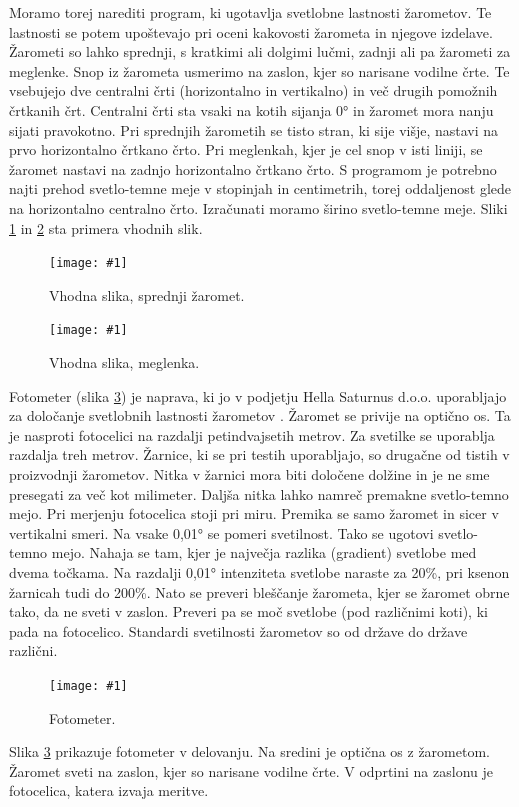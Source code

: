 \documentclass[oneside, a4paper, 12pt]{book}
\newcommand{\slika}[3]{
	\begin{figure}
	\begin{center}
	\texttt{[image: \#1]}
	\end{center}
	\vspace{-20pt}
	\caption{#2}
	\label{#3}
	\end{figure}
}
\begin{document}
Moramo torej narediti program, ki ugotavlja svetlobne lastnosti žarometov. 
Te lastnosti se potem upoštevajo pri oceni kakovosti žarometa in njegove 
izdelave. Žarometi so lahko sprednji, s kratkimi ali dolgimi lučmi, zadnji 
ali pa žarometi za meglenke. Snop iz žarometa usmerimo na zaslon, kjer so 
narisane vodilne črte. Te vsebujejo dve centralni črti (horizontalno in 
vertikalno) in več drugih pomožnih črtkanih črt. Centralni črti sta vsaki 
na kotih sijanja 0° in žaromet mora nanju sijati pravokotno. Pri sprednjih 
žarometih se tisto stran, ki sije višje, nastavi na prvo horizontalno 
črtkano črto. Pri meglenkah, kjer je cel snop v isti liniji, se žaromet 
nastavi na zadnjo horizontalno črtkano črto. S programom je potrebno najti 
prehod svetlo-temne meje v stopinjah in centimetrih, torej oddaljenost 
glede na horizontalno centralno črto. Izračunati moramo širino svetlo-temne 
meje. Sliki \ref{pic:vhp1} in \ref{pic:vhp2} sta primera vhodnih slik.

\slika{slike/original.jpg}{Vhodna slika, sprednji žaromet.}{pic:vhp1}
\slika{slike/levi3.JPG}{Vhodna slika, meglenka.}{pic:vhp2}

Fotometer (slika \ref{pic:fotometer}) je naprava, ki jo v podjetju Hella 
Saturnus d.o.o. uporabljajo za določanje svetlobnih lastnosti žarometov 
\cite{hella-fotometer}. Žaromet se privije na optično os. Ta je nasproti 
fotocelici na razdalji petindvajsetih metrov. Za svetilke se uporablja 
razdalja treh metrov. Žarnice, ki se pri testih uporabljajo, so drugačne 
od tistih v proizvodnji žarometov. Nitka v žarnici mora biti določene 
dolžine in je ne sme presegati za več kot milimeter. Daljša nitka lahko 
namreč premakne svetlo-temno mejo. Pri merjenju fotocelica stoji pri miru. 
Premika se samo žaromet in sicer v vertikalni smeri. Na vsake 0,01° se 
pomeri svetilnost. Tako se ugotovi svetlo-temno mejo. Nahaja se tam, 
kjer je največja razlika (gradient) svetlobe med dvema točkama. Na 
razdalji 0,01° intenziteta svetlobe naraste za 20\%, pri ksenon žarnicah 
tudi do 200\%. Nato se preveri bleščanje žarometa, kjer se žaromet obrne 
tako, da ne sveti v zaslon. Preveri pa se moč svetlobe (pod različnimi 
koti), ki pada na fotocelico. Standardi svetilnosti žarometov so od države 
do države različni. 

\slika{slike/Photometer.jpg}{Fotometer.}{pic:fotometer}
Slika \ref{pic:fotometer} prikazuje fotometer v delovanju. Na sredini je 
optična os z žarometom. Žaromet sveti na zaslon, kjer so narisane vodilne 
črte. V odprtini na zaslonu je fotocelica, katera izvaja meritve.
\end{document}
